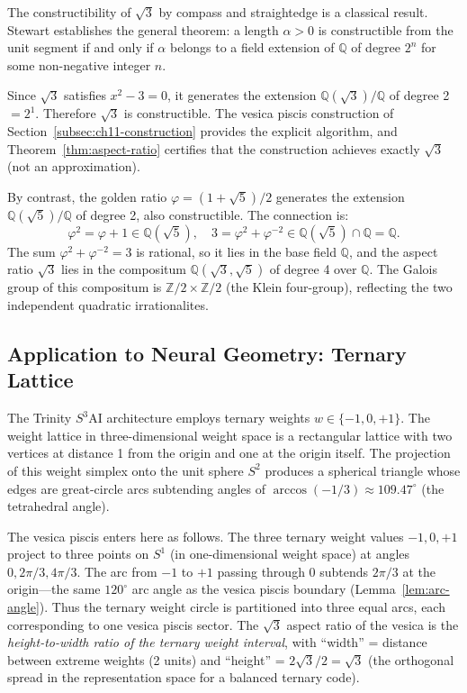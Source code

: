 The constructibility of \(\sqrt{3}\) by compass and straightedge is a
classical result.
Stewart \cite{stewart_galois_theory} establishes the general theorem:
a length \(\alpha > 0\) is constructible from the unit segment if and only
if \(\alpha\) belongs to a field extension of \(\mathbb{Q}\) of degree
\(2^n\) for some non-negative integer \(n\).

Since \(\sqrt{3}\) satisfies \(x^2 - 3 = 0\), it generates the extension
\(\mathbb{Q}(\sqrt{3}) / \mathbb{Q}\) of degree 2 \(= 2^1\).
Therefore \(\sqrt{3}\) is constructible.
The vesica piscis construction of Section~\ref{subsec:ch11-construction}
provides the explicit algorithm, and Theorem~\ref{thm:aspect-ratio}
certifies that the construction achieves exactly \(\sqrt{3}\) (not an
approximation).

By contrast, the golden ratio \(\varphi = (1+\sqrt{5})/2\) generates the
extension \(\mathbb{Q}(\sqrt{5})/\mathbb{Q}\) of degree 2, also
constructible.
The connection is:
\[
  \varphi^2 = \varphi + 1 \in \mathbb{Q}(\sqrt{5}), \quad
  3 = \varphi^2 + \varphi^{-2} \in \mathbb{Q}(\sqrt{5}) \cap \mathbb{Q} = \mathbb{Q}.
\]
The sum \(\varphi^2 + \varphi^{-2} = 3\) is rational, so it lies in the
base field \(\mathbb{Q}\), and the aspect ratio \(\sqrt{3}\) lies in the
compositum \(\mathbb{Q}(\sqrt{3}, \sqrt{5})\) of degree 4 over \(\mathbb{Q}\).
The Galois group of this compositum is \(\mathbb{Z}/2 \times \mathbb{Z}/2\)
(the Klein four-group), reflecting the two independent quadratic irrationalites.

\subsection{Application to Neural Geometry: Ternary Lattice}
\label{subsec:ch11-ternary}

The Trinity \(S^3\)AI architecture employs ternary weights
\(w \in \{-1, 0, +1\}\).
The weight lattice in three-dimensional weight space is a rectangular
lattice with two vertices at distance 1 from the origin and one at
the origin itself.
The projection of this weight simplex onto the unit sphere \(S^2\)
produces a spherical triangle whose edges are great-circle arcs
subtending angles of \(\arccos(-1/3) \approx 109.47^\circ\)
(the tetrahedral angle).

The vesica piscis enters here as follows.
The three ternary weight values \(-1, 0, +1\) project to three points
on \(S^1\) (in one-dimensional weight space) at angles
\(0, 2\pi/3, 4\pi/3\).
The arc from \(-1\) to \(+1\) passing through \(0\) subtends \(2\pi/3\)
at the origin—the same \(120^\circ\) arc angle as the vesica piscis
boundary (Lemma~\ref{lem:arc-angle}).
Thus the ternary weight circle is partitioned into three equal arcs,
each corresponding to one vesica piscis sector.
The \(\sqrt{3}\) aspect ratio of the vesica is the
\emph{height-to-width ratio of the ternary weight interval}, with
``width'' = distance between extreme weights (2 units) and
``height'' = \(2\sqrt{3}/2 = \sqrt{3}\) (the orthogonal spread in
the representation space for a balanced ternary code).

